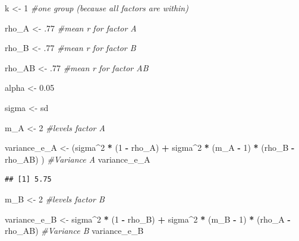 \documentclass[]{book}
\newenvironment{Shaded}{\begin{snugshade}}{\end{snugshade}}
\newcommand{\CommentTok}[1]{\textcolor[rgb]{0.56,0.35,0.01}{\textit{#1}}}
\newcommand{\DecValTok}[1]{\textcolor[rgb]{0.00,0.00,0.81}{#1}}
\newcommand{\FloatTok}[1]{\textcolor[rgb]{0.00,0.00,0.81}{#1}}
\newcommand{\NormalTok}[1]{#1}
\newcommand{\OperatorTok}[1]{\textcolor[rgb]{0.81,0.36,0.00}{\textbf{#1}}}
\newcommand{\StringTok}[1]{\textcolor[rgb]{0.31,0.60,0.02}{#1}}
\begin{document}
\begin{Shaded}
\begin{Highlighting}[]
\NormalTok{k <-}\StringTok{ }\DecValTok{1} \CommentTok{#one group (because all factors are within)}

\NormalTok{rho_A <-}\StringTok{ }\FloatTok{.77} \CommentTok{#mean r for factor A}

\NormalTok{rho_B <-}\StringTok{ }\FloatTok{.77} \CommentTok{#mean r for factor B}

\NormalTok{rho_AB <-}\StringTok{ }\FloatTok{.77} \CommentTok{#mean r for factor AB}

\NormalTok{alpha <-}\StringTok{ }\FloatTok{0.05}

\NormalTok{sigma <-}\StringTok{ }\NormalTok{sd}

\NormalTok{m_A <-}\StringTok{ }\DecValTok{2} \CommentTok{#levels factor A}

\NormalTok{variance_e_A <-}\StringTok{ }\NormalTok{(sigma}\OperatorTok{^}\DecValTok{2} \OperatorTok{*}\StringTok{ }\NormalTok{(}\DecValTok{1} \OperatorTok{-}\StringTok{ }\NormalTok{rho_A) }\OperatorTok{+}\StringTok{ }
\StringTok{  }\NormalTok{sigma}\OperatorTok{^}\DecValTok{2} \OperatorTok{*}\StringTok{ }\NormalTok{(m_A }\OperatorTok{-}\StringTok{ }\DecValTok{1}\NormalTok{) }\OperatorTok{*}\StringTok{ }\NormalTok{(rho_B }\OperatorTok{-}\StringTok{ }\NormalTok{rho_AB) )}
\CommentTok{#Variance A}
\NormalTok{variance_e_A}
\end{Highlighting}
\end{Shaded}

\begin{verbatim}
## [1] 5.75
\end{verbatim}

\begin{Shaded}
\begin{Highlighting}[]
\NormalTok{m_B <-}\StringTok{ }\DecValTok{2} \CommentTok{#levels factor B}

\NormalTok{variance_e_B <-}\StringTok{ }\NormalTok{sigma}\OperatorTok{^}\DecValTok{2} \OperatorTok{*}\StringTok{ }\NormalTok{(}\DecValTok{1} \OperatorTok{-}\StringTok{ }\NormalTok{rho_B) }\OperatorTok{+}\StringTok{ }
\StringTok{  }\NormalTok{sigma}\OperatorTok{^}\DecValTok{2} \OperatorTok{*}\StringTok{ }\NormalTok{(m_B }\OperatorTok{-}\StringTok{ }\DecValTok{1}\NormalTok{) }\OperatorTok{*}\StringTok{ }\NormalTok{(rho_A }\OperatorTok{-}\StringTok{ }\NormalTok{rho_AB)}
\CommentTok{#Variance B}
\NormalTok{variance_e_B}
\end{Highlighting}
\end{Shaded}
\end{document}
